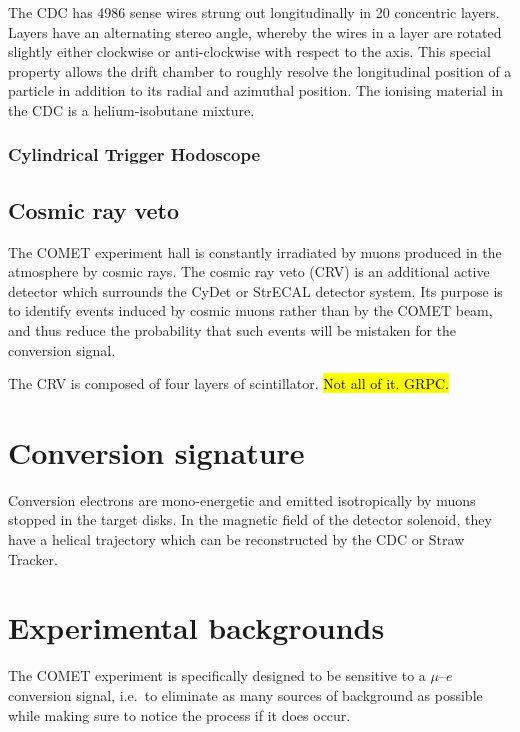 The CDC has 4986 sense wires strung out longitudinally in 20 concentric layers.
Layers have an alternating stereo angle, whereby the wires in a layer are
rotated slightly either clockwise or anti-clockwise with respect to the axis.
This special property allows the drift chamber to roughly resolve the
longitudinal position of a particle in addition to its radial and azimuthal
position. The ionising material in the CDC is a helium-isobutane mixture.


\subsubsection{Cylindrical Trigger Hodoscope}


\subsection{Cosmic ray veto}
The COMET experiment hall is constantly irradiated by muons produced in the
atmosphere by cosmic rays. The cosmic ray veto (CRV) is an additional active detector
which surrounds the CyDet or StrECAL detector system. Its purpose is to identify
events induced by cosmic muons rather than by the COMET beam, and thus reduce
the probability that such events will be mistaken for the conversion signal.

The CRV is composed of four layers of scintillator. \hl{Not all of it. GRPC.}

\section{Conversion signature}
Conversion electrons are mono-energetic and emitted isotropically by muons
stopped in the target disks. In the magnetic field of the detector solenoid,
they have a helical trajectory which can be reconstructed by the CDC or Straw
Tracker.




\section{Experimental backgrounds}\label{sec:backgrounds}
The COMET experiment is specifically designed to be sensitive to a $\mu$--$e$
conversion signal, i.e.\ to eliminate as many sources of background as possible
while making sure to notice the process if it does occur. 

